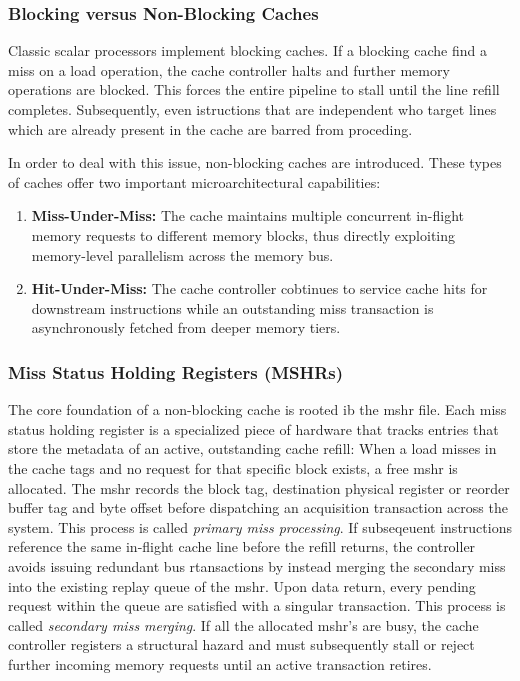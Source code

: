 \subsubsection{Blocking versus Non-Blocking Caches}
 Classic scalar processors implement blocking caches.
 If a blocking cache find a miss on a load operation,
 the cache controller halts and further memory operations are blocked.
 This forces the entire pipeline to stall until the line refill completes.
 Subsequently, even istructions that are independent who target lines which are already present in the cache are barred from proceding.

 In order to deal with this issue, non-blocking caches are introduced.\cite{kroft1981lockup}
 These types of caches offer two important microarchitectural capabilities:

 \begin{enumerate} %
   \item \textbf{Miss-Under-Miss:} The cache maintains multiple concurrent in-flight memory requests to different memory blocks,
     thus directly exploiting memory-level parallelism across the memory bus.
   \item \textbf{Hit-Under-Miss:} The cache controller cobtinues to service cache hits for downstream instructions while an outstanding miss transaction is asynchronously fetched from deeper memory tiers.
 \end{enumerate}

\subsubsection{Miss Status Holding Registers (MSHRs)}

The core foundation of a non-blocking cache is rooted ib the mshr file.
Each miss status holding register is a specialized piece of hardware that tracks entries that store the metadata of an active, outstanding cache refill:
When a load misses in the cache tags and no request for that specific block exists, a free mshr is allocated.
The mshr records the block tag, destination physical register or reorder buffer tag and byte offset before dispatching an acquisition transaction across the system.
This process is called \textit{primary miss processing}.
If subseqeuent instructions reference the same in-flight cache line before the refill returns,
the controller avoids issuing redundant bus rtansactions by instead merging the secondary miss into the existing replay queue of the mshr.
Upon data return, every pending request within the queue are satisfied with a singular transaction. 
This process is called \textit{secondary miss merging}.
If all the allocated mshr's are busy,
the cache controller registers a structural hazard and must subsequently stall or reject further incoming memory requests until an active transaction retires.

